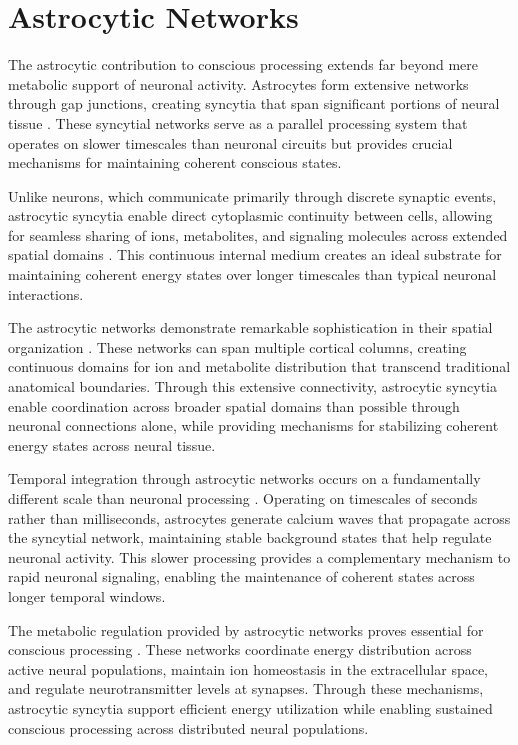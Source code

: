 \section{Astrocytic Networks}

The astrocytic contribution to conscious processing extends far beyond mere metabolic support of neuronal activity. Astrocytes form extensive networks through gap junctions, creating syncytia that span significant portions of neural tissue \cite{Giaume2010}. These syncytial networks serve as a parallel processing system that operates on slower timescales than neuronal circuits but provides crucial mechanisms for maintaining coherent conscious states.

Unlike neurons, which communicate primarily through discrete synaptic events, astrocytic syncytia enable direct cytoplasmic continuity between cells, allowing for seamless sharing of ions, metabolites, and signaling molecules across extended spatial domains \cite{Nagy2000}. This continuous internal medium creates an ideal substrate for maintaining coherent energy states over longer timescales than typical neuronal interactions.

The astrocytic networks demonstrate remarkable sophistication in their spatial organization \cite{Oberheim2012}. These networks can span multiple cortical columns, creating continuous domains for ion and metabolite distribution that transcend traditional anatomical boundaries. Through this extensive connectivity, astrocytic syncytia enable coordination across broader spatial domains than possible through neuronal connections alone, while providing mechanisms for stabilizing coherent energy states across neural tissue.

Temporal integration through astrocytic networks occurs on a fundamentally different scale than neuronal processing \cite{Bazargani2016}. Operating on timescales of seconds rather than milliseconds, astrocytes generate calcium waves that propagate across the syncytial network, maintaining stable background states that help regulate neuronal activity. This slower processing provides a complementary mechanism to rapid neuronal signaling, enabling the maintenance of coherent states across longer temporal windows.

The metabolic regulation provided by astrocytic networks proves essential for conscious processing \cite{Verkhratsky2018}. These networks coordinate energy distribution across active neural populations, maintain ion homeostasis in the extracellular space, and regulate neurotransmitter levels at synapses. Through these mechanisms, astrocytic syncytia support efficient energy utilization while enabling sustained conscious processing across distributed neural populations.

